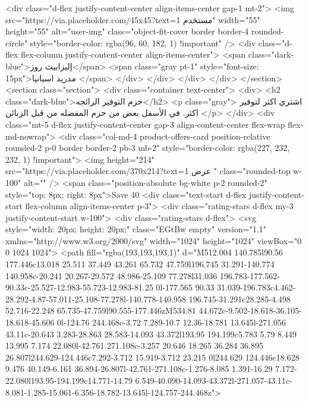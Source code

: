           <div class="d-flex justify-content-center align-items-center gap-1 mt-2">
            <img src="https://via.placeholder.com/45x45?text=مستخدم 1" width="55" height="55" alt="user-img"
              class="object-fit-cover border border-4 rounded-circle"
              style="border-color: rgba(96, 60, 182, 1) !important" />
            <div class="d-flex flex-column justify-content-center align-items-center">
              <span class="dark-blue">إليزابيث روز</span>
              <span class="gray pt-1" style="font-size: 15px">مدريد اسبانيا
              </span>
            </div>
          </div>
        </div>
      </div>
    </section>
    <section class="section">
      <div class="container text-center">
        <div>
          <h2 class="dark-blue">حزم التوفير الرائجه</h2>
          <p class="gray">
            اشتري اكثر لتوفير اكثر. في الأسفل بعض من حزم المفضله من قبل الزبائن
          </p>
        </div>
        <div class="mt-5 d-flex justify-content-center gap-3 align-content-center flex-wrap flex-md-nowrap">
          <div class="col-md-4 product-offers-card position-relative rounded-2 p-0 border border-2 pb-3 mb-2"
            style="border-color: rgba(227, 232, 232, 1) !important">
            <img height="214" src="https://via.placeholder.com/370x214?text=عرض 1 " class="rounded-top w-100"
              alt="" />
            <span class="position-absolute bg-white p-2 rounded-2" style="top: 8px; right: 8px">Save 40%
            <div class="text-start d-flex justify-content-start flex-column align-items-center p-3">
              <div class="rating-stars d-flex my-3 justify-content-start w-100">
                <div class="rating-stars d-flex">
                  <svg style="width: 20px; height: 20px;" class="EGtBw empty" version="1.1"
                    xmlns="http://www.w3.org/2000/svg" width="1024" height="1024" viewBox="0 0 1024 1024">
                    <path fill="rgba(193,193,193,1)"
                      d="M512.004 140.785l90.56 177.446c13.018 25.511 37.449 43.261 65.732 47.759l196.745 31.291-140.774 140.958c-20.241 20.267-29.572 48.986-25.109 77.278l31.036 196.783-177.562-90.33c-25.527-12.983-55.723-12.983-81.25 0l-177.565 90.33 31.039-196.783c4.462-28.292-4.87-57.011-25.108-77.278l-140.778-140.958 196.745-31.291c28.285-4.498 52.716-22.248 65.735-47.759l90.555-177.446zM534.81 44.672c-9.502-18.618-36.105-18.618-45.606 0l-124.76 244.468c-3.72 7.289-10.7 12.36-18.781 13.645l-271.056 43.11c-20.643 3.283-28.863 28.583-14.093 43.372l193.95 194.199c5.783 5.79 8.449 13.995 7.174 22.080l-42.761 271.108c-3.257 20.646 18.265 36.284 36.895 26.807l244.629-124.446c7.292-3.712 15.919-3.712 23.215 0l244.629 124.446c18.628 9.476 40.149-6.161 36.894-26.807l-42.761-271.108c-1.276-8.085 1.391-16.29 7.172-22.080l193.95-194.199c14.771-14.79 6.549-40.090-14.093-43.372l-271.057-43.11c-8.081-1.285-15.061-6.356-18.782-13.645l-124.757-244.468z">
